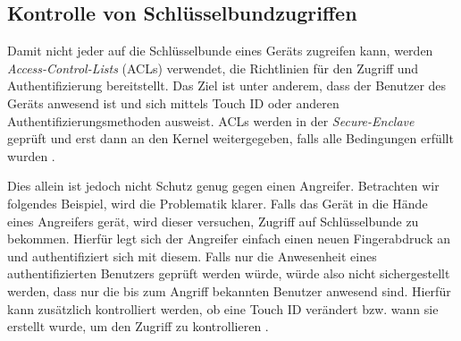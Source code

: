 \subsection{Kontrolle von Schlüsselbundzugriffen}
Damit nicht jeder auf die Schlüsselbunde eines Geräts zugreifen kann, werden
\textit{Access-Control-Lists} (ACLs) verwendet, die Richtlinien für den Zugriff
und Authentifizierung bereitstellt. Das Ziel ist unter anderem, dass der
Benutzer des Geräts anwesend ist und sich mittels Touch ID oder anderen
Authentifizierungsmethoden ausweist. ACLs werden in der \textit{Secure-Enclave}
geprüft und erst dann an den Kernel weitergegeben, falls alle Bedingungen
erfüllt wurden \cite{apple2020}.

Dies allein ist jedoch nicht Schutz genug gegen einen Angreifer. Betrachten wir
folgendes Beispiel, wird die Problematik klarer. Falls das Gerät in die Hände
eines Angreifers gerät, wird dieser versuchen, Zugriff auf Schlüs\-sel\-bun\-de zu
bekommen. Hierfür legt sich der Angreifer einfach einen neuen Fingerabdruck an
und authentifiziert sich mit diesem. Falls nur die Anwesenheit eines
authentifizierten Benutzers geprüft werden würde, würde also nicht
sichergestellt werden, dass nur die bis zum Angriff bekannten Benutzer anwesend
sind. Hierfür kann zusätzlich kontrolliert werden, ob eine Touch ID verändert
bzw. wann sie erstellt wurde, um den Zugriff zu kontrollieren \cite{apple2020}.
